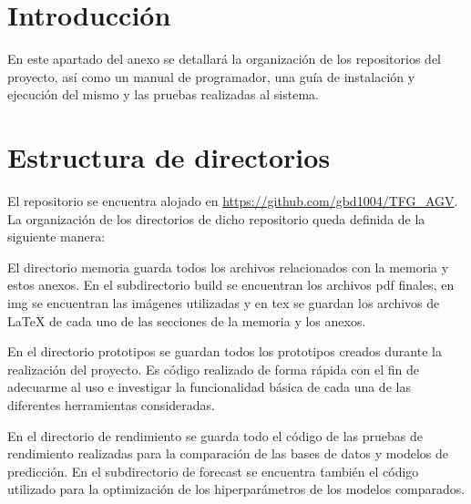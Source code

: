 
\section{Introducción}

En este apartado del anexo se detallará la organización de los repositorios del proyecto, así
como un manual de programador, una guía de instalación y ejecución del mismo y las pruebas realizadas
al sistema.

\section{Estructura de directorios}

El repositorio se encuentra alojado en \url{https://github.com/gbd1004/TFG_AGV}. La organización de los 
directorios de dicho repositorio queda definida de la siguiente manera:


El directorio memoria guarda todos los archivos relacionados con la memoria y estos anexos. En 
el subdirectorio build se encuentran los archivos pdf finales, en img se encuentran las imágenes 
utilizadas y en tex se guardan los archivos de LaTeX de cada uno de las secciones de la memoria y 
los anexos.


En el directorio prototipos se guardan todos los prototipos creados durante la realización del 
proyecto. Es código realizado de forma rápida con el fin de adecuarme al uso e investigar la funcionalidad
básica de cada una de las diferentes herramientas consideradas.


En el directorio de rendimiento se guarda todo el código de las pruebas de rendimiento realizadas 
para la comparación de las bases de datos y modelos de predicción. En el subdirectorio de 
forecast se encuentra también el código utilizado para la optimización de los hiperparámetros de 
los modelos comparados.


